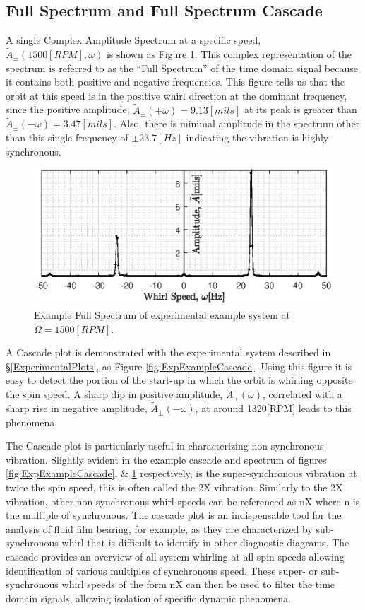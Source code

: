 \subsection{Full Spectrum and Full Spectrum Cascade}
A single Complex Amplitude Spectrum at a specific speed, $ \tilde{A}_\pm(1500[RPM],\omega) $ is shown as Figure \ref{fig:ExpExampleSpectrum}. This complex representation of the spectrum is referred to as the ``Full Spectrum'' of the time domain signal because it contains both positive and negative frequencies. This figure tells us that the orbit at this speed is in the positive whirl direction at the dominant frequency, since the positive amplitude, $ \tilde{A}_\pm(+\omega)=9.13[mils] $ at its peak is greater than $ \tilde{A}_\pm(-\omega)=3.47[mils] $. Also, there is minimal amplitude in the spectrum other than this single frequency of $ \pm23.7[Hz] $ indicating the vibration is highly synchronous.\par
\begin{figure}
	\centering
	\includegraphics[]{./figures/ExpExampleSpectrum.eps}
	\caption{Example Full Spectrum of experimental example system at $ \Omega=1500[RPM] $.}
	\label{fig:ExpExampleSpectrum}
\end{figure}
A Cascade plot is demonstrated with the experimental system described in \S\ref{ExperimentalPlots}, as Figure \ref{fig:ExpExampleCascade}. Using this figure it is easy to detect the portion of the start-up in which the orbit is whirling opposite the spin speed. A sharp dip in positive amplitude, $ \tilde{A}_\pm(\omega) $, correlated with a sharp rise in negative amplitude, $ \tilde{A}_\pm(-\omega) $, at around 1320[RPM] leads to this phenomena.\par 
The Cascade plot is particularly useful in characterizing non-synchronous vibration. Slightly evident in the example cascade and spectrum of figures \ref{fig:ExpExampleCascade}, \& \ref{fig:ExpExampleSpectrum} respectively, is the super-synchronous vibration at twice the spin speed, this is often called the 2X vibration. Similarly to the 2X vibration, other non-synchronous whirl speeds can be referenced as nX where n is the multiple of synchronous. The cascade plot is an indispensable tool for the analysis of fluid film bearing, for example, as they are characterized by sub-synchronous whirl that is difficult to identify in other diagnostic diagrams. The cascade provides an overview of all system whirling at all spin speeds allowing identification of various multiples of synchronous speed. These super- or sub-synchronous whirl speeds of the form nX can then be used to filter the time domain signals, allowing isolation of specific dynamic phenomena.\par 
